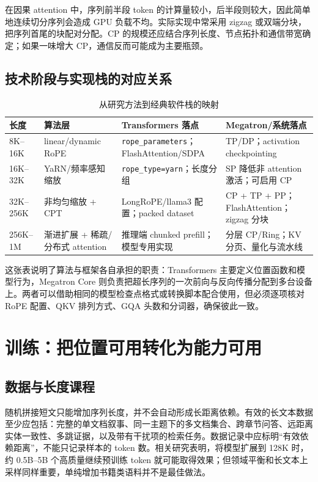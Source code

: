 \documentclass[UTF8,10pt,a4paper,fontset=none]{ctexart}
\begin{document}
在因果 attention 中，序列前半段 token 的计算量较小，后半段则较大，因此简单地连续切分序列会造成 GPU 负载不均。实际实现中常采用 zigzag 或双端分块，把序列首尾的块配对分配。CP 的规模还应结合序列长度、节点拓扑和通信带宽确定；如果一味增大 CP，通信反而可能成为主要瓶颈。

\subsection{技术阶段与实现栈的对应关系}
\begin{table}[h]
\centering\small
\caption{从研究方法到经典软件栈的映射}
\begin{tabularx}{\textwidth}{p{1.5cm}p{3.1cm}X X}
\toprule
长度 & 算法层 & Transformers 落点 & Megatron/系统落点\\
\midrule
8K--16K & linear/dynamic RoPE & \texttt{rope\_parameters}；FlashAttention/SDPA & TP/DP；activation checkpointing\\
16K--32K & YaRN/频率感知缩放 & \texttt{rope\_type=yarn}；长度分组 & SP 降低非 attention 激活；可启用 CP\\
32K--256K & 非均匀缩放 + CPT & LongRoPE/llama3 配置；packed dataset & CP + TP + PP；FlashAttention；zigzag 分块\\
256K--1M & 渐进扩展 + 稀疏/分布式 attention & 推理端 chunked prefill；模型专用实现 & 分层 CP/Ring；KV 分页、量化与流水线\\
\bottomrule
\end{tabularx}
\end{table}

这张表说明了算法与框架各自承担的职责：Transformers 主要定义位置函数和模型行为，Megatron Core 则负责把超长序列的一次前向与反向传播分配到多台设备上。两者可以借助相同的模型检查点格式或转换脚本配合使用，但必须逐项核对 RoPE 配置、QKV 排列方式、GQA 头数和分词器，确保彼此一致。

\section{训练：把位置可用转化为能力可用}
\subsection{数据与长度课程}
随机拼接短文只能增加序列长度，并不会自动形成长距离依赖。有效的长文本数据至少应包括：完整的单文档叙事、同一主题下的多文档集合、跨章节问答、远距离实体一致性、多跳证据，以及带有干扰项的检索任务。数据记录中应标明“有效依赖距离”，不能只记录样本的 token 数。相关研究表明，将模型扩展到 128K 时，约 0.5B--5B 个高质量继续预训练 token 就可能取得效果；但领域平衡和长文本上采样同样重要，单纯增加书籍类语料并不是最佳做法\cite{fu2024data}。
\end{document}
